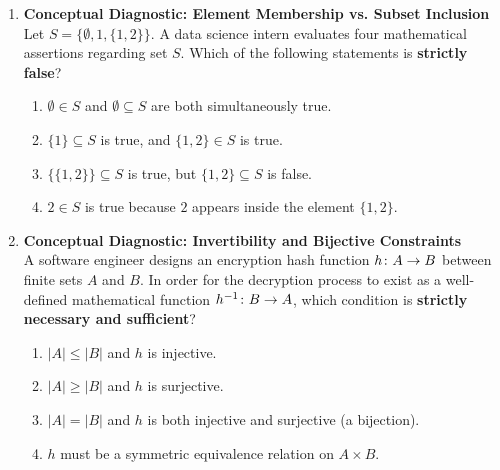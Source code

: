 \begin{enumerate}[resume]
\item \textbf{Conceptual Diagnostic: Element Membership vs. Subset Inclusion} \\
Let $S = \{\emptyset, 1, \{1, 2\}\}$. A data science intern evaluates four mathematical assertions regarding set $S$. Which of the following statements is \textbf{strictly false}?
\begin{enumerate}
    \item $\emptyset \in S$ and $\emptyset \subseteq S$ are both simultaneously true.
    \item $\{1\} \subseteq S$ is true, and $\{1, 2\} \in S$ is true.
    \item $\{\{1, 2\}\} \subseteq S$ is true, but $\{1, 2\} \subseteq S$ is false.
    \item $2 \in S$ is true because $2$ appears inside the element $\{1, 2\}$.
\end{enumerate}

\item \textbf{Conceptual Diagnostic: Invertibility and Bijective Constraints} \\
A software engineer designs an encryption hash function $h \colon A \to B$ between finite sets $A$ and $B$. In order for the decryption process to exist as a well-defined mathematical function $h^{-1} \colon B \to A$, which condition is \textbf{strictly necessary and sufficient}?
\begin{enumerate}
    \item $|A| \le |B|$ and $h$ is injective.
    \item $|A| \ge |B|$ and $h$ is surjective.
    \item $|A| = |B|$ and $h$ is both injective and surjective (a bijection).
    \item $h$ must be a symmetric equivalence relation on $A \times B$.
\end{enumerate}
\end{enumerate}
